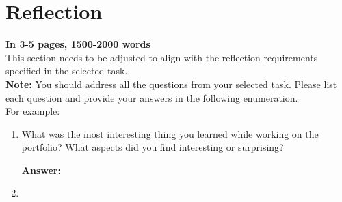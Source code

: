 \section{Reflection}
\label{sec:reflection}

\textbf{In 3-5 pages, 1500-2000 words}\\

This section needs to be adjusted to align with the reflection requirements specified in the selected task.\\

\textbf{Note:} You should address all the questions from your selected task. Please list each question and provide your answers in the following enumeration.\\

For example:
\begin{enumerate}
    \item What was the most interesting thing you learned while working on the portfolio? What aspects did you find interesting or surprising? 
    
     \textbf{Answer:}
    
     \item

    
\end{enumerate}




 

 

